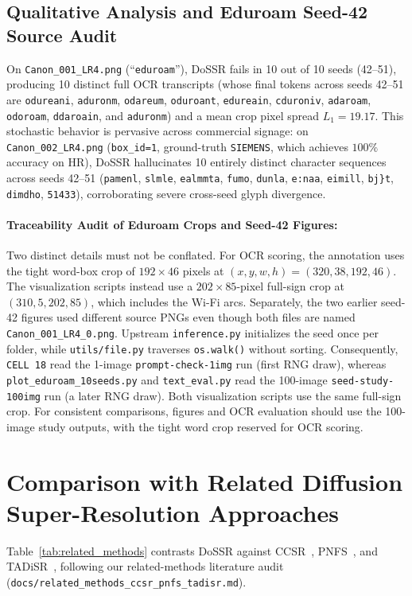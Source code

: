 \documentclass[11pt]{article}
\begin{document}
\subsection{Qualitative Analysis and Eduroam Seed-42 Source Audit}
On \texttt{Canon\_001\_LR4.png} (``\texttt{eduroam}''), DoSSR fails in 10 out of 10 seeds (42--51), producing 10 distinct full OCR transcripts (whose final tokens across seeds 42--51 are \texttt{odureani}, \texttt{aduronm}, \texttt{odareum}, \texttt{oduroant}, \texttt{edureain}, \texttt{cduroniv}, \texttt{adaroam}, \texttt{odoroam}, \texttt{ddaroain}, and \texttt{aduronm}) and a mean crop pixel spread $L_1 = 19.17$. This stochastic behavior is pervasive across commercial signage: on \texttt{Canon\_002\_LR4.png} (\texttt{box\_id=1}, ground-truth \texttt{SIEMENS}, which achieves $100\%$ accuracy on HR), DoSSR hallucinates 10 entirely distinct character sequences across seeds 42--51 (\texttt{pamenl}, \texttt{slmle}, \texttt{ealmmta}, \texttt{fumo}, \texttt{dunla}, \texttt{e:naa}, \texttt{eimill}, \texttt{bj\}t}, \texttt{dimdho}, \texttt{51433}), corroborating severe cross-seed glyph divergence.

\paragraph{Traceability Audit of Eduroam Crops and Seed-42 Figures:} Two distinct details must not be conflated. For OCR scoring, the annotation uses the tight word-box crop of $192\times 46$ pixels at $(x,y,w,h)=(320,38,192,46)$. The visualization scripts instead use a $202\times 85$-pixel full-sign crop at $(310,5,202,85)$, which includes the Wi-Fi arcs. Separately, the two earlier seed-42 figures used different source PNGs even though both files are named \texttt{Canon\_001\_LR4\_0.png}. Upstream \texttt{inference.py} initializes the seed once per folder, while \texttt{utils/file.py} traverses \texttt{os.walk()} without sorting. Consequently, \texttt{CELL 18} read the 1-image \texttt{prompt-check-1img} run (first RNG draw), whereas \texttt{plot\_eduroam\_10seeds.py} and \texttt{text\_eval.py} read the 100-image \texttt{seed-study-100img} run (a later RNG draw). Both visualization scripts use the same full-sign crop. For consistent comparisons, figures and OCR evaluation should use the 100-image study outputs, with the tight word crop reserved for OCR scoring.

\section{Comparison with Related Diffusion Super-Resolution Approaches}
Table~\ref{tab:related_methods} contrasts DoSSR against CCSR~\cite{sun2024ccsr}, PNFS~\cite{jiang2025pnfs}, and TADiSR~\cite{hu2025tadIsr}, following our related-methods literature audit (\texttt{docs/related\_methods\_ccsr\_pnfs\_tadisr.md}).
\end{document}
